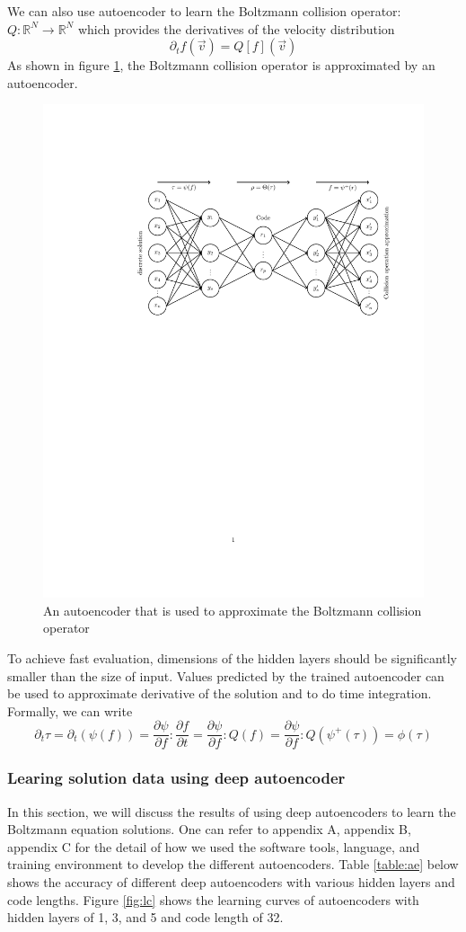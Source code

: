 \documentclass{article}
\begin{document}
We can also use autoencoder to learn the Boltzmann collision operator: $Q:\mathbb{R}^N\rightarrow\mathbb{R}^N$ which provides the derivatives of the velocity distribution
\begin{equation}
\partial_t{f(\vec{v})} = Q[f](\vec{v})
\end{equation}
As shown in figure \ref{fig:ColOpAE}, the Boltzmann collision operator is approximated by an autoencoder.
\begin{figure}[h]
	\centering
	\includegraphics[width=.75\textwidth]{ColOpAE.pdf}
	\caption{An autoencoder that is used to approximate the Boltzmann collision operator}
	\label{fig:ColOpAE}
\end{figure}
\noindent To achieve fast evaluation, dimensions of the hidden layers should be significantly smaller than the size of input. Values predicted by the trained autoencoder can be used to approximate derivative of the solution and to do time integration. Formally, we can write
\begin{equation}
\partial_t{\tau} = \partial_t(\psi(f)) = \frac{\partial\psi}{\partial f}:\frac{\partial f}{\partial t} = \frac{\partial\psi}{\partial f}:Q(f) = \frac{\partial\psi}{\partial f}:Q(\psi^+(\tau)) = \phi(\tau)
\end{equation}

\subsubsection{Learing solution data using deep autoencoder}
In this section, we will discuss the results of using deep autoencoders to learn the Boltzmann equation solutions. One can refer to appendix A, appendix B, appendix C for the detail of how we used the software tools, language, and training environment to develop the different autoencoders. Table \ref{table:ae} below shows the accuracy of different deep autoencoders with various hidden layers and code lengths. Figure \ref{fig:lc} shows the learning curves of autoencoders with hidden layers of 1, 3, and 5 and code length of 32.
\end{document}
